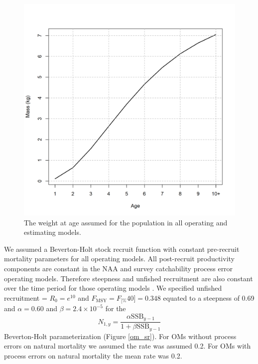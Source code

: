 \documentclass[
  12pt,
]{article}
\newcommand{\Fmsy}{\ensuremath{F_{\text{MSY}}}\xspace}
\newcommand{\Fspr}[1]{\ensuremath{F_{\text{{#1}\%}}}\xspace}
\begin{document}
\begin{figure}
\caption{The weight at age assumed for the population in all operating and estimating models.}\label{om_waa}
\begin{center}
\includegraphics[width = \textwidth]{om_waa.png}
\end{center}
\end{figure}

We assumed a Beverton-Holt stock recruit function with constant
pre-recruit mortality parameters for all operating models. All
post-recruit productivity components are constant in the NAA and survey
catchability process error operating models. Therefore steepness and
unfished recruitment are also constant over the time period for those
operating models \citep{millerbrooks21}. We specified unfished
recruitment = \(R_0 = e^{10}\) and \(\Fmsy = \Fspr[40] = 0.348\) equated
to a steepness of 0.69 and \(\alpha=0.60\) and
\(\beta = 2.4 \times 10^{-5}\) for the \[
N_{1,y} = \frac{\alpha \text{SSB}_{y-1}}{1 + \beta \text{SSB}_{y-1}} 
\] Beverton-Holt parameterization (Figure \ref{om_sr}). For OMs without
process errors on natural mortality we assumed the rate was assumed 0.2.
For OMs with process errors on natural mortality the mean rate was 0.2.
\end{document}
